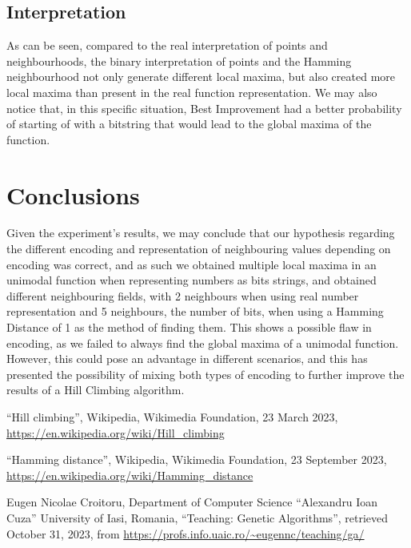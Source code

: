 \documentclass{article}
\begin{document}
\subsection{Interpretation}
As can be seen, compared to the real interpretation of points and neighbourhoods, the binary interpretation of points and the Hamming neighbourhood not only generate different local maxima, but also created more local maxima than present in the real function representation. We may also notice that, in this specific situation, Best Improvement had a better probability of starting of with a bitstring that would lead to the global maxima of the function.

\section {Conclusions}
Given the experiment's results, we may conclude that our hypothesis regarding the different encoding and representation of neighbouring values depending on encoding was correct, and as such we obtained multiple local maxima in an unimodal function when representing numbers as bits strings, and obtained different neighbouring fields, with 2 neighbours when using real number representation and 5 neighbours, the number of bits, when using a Hamming Distance of 1 as the method of finding them. This shows a possible flaw in encoding, as we failed to always find the global maxima of a unimodal function. However, this could pose an advantage in different scenarios, and this has presented the possibility of mixing both types of encoding to further improve the results of a Hill Climbing algorithm.

\begin{thebibliography}{9}

``Hill climbing'', Wikipedia, Wikimedia Foundation, 23 March 2023, \url{https://en.wikipedia.org/wiki/Hill\_climbing}

``Hamming distance'', Wikipedia, Wikimedia Foundation, 23 September 2023, \url{https://en.wikipedia.org/wiki/Hamming\_distance}

Eugen Nicolae Croitoru, Department of Computer Science ``Alexandru Ioan Cuza'' University of Iasi, Romania, ``Teaching: Genetic Algorithms'', retrieved October 31, 2023, from \url{https://profs.info.uaic.ro/~eugennc/teaching/ga/}

\end{thebibliography}
\end{document}
